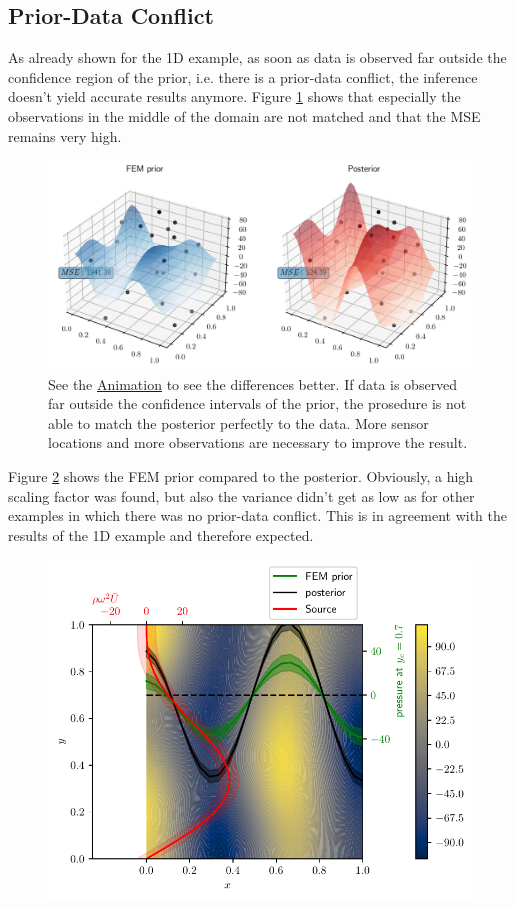 \documentclass[%
  a4paper,oneside,%
  11pt,%
  smallchapters,
  style=printdev,
  extramargin,
  green,%
  rgb, <cmyk>
  ]{tubsbook}
\begin{document}
\subsection{Prior-Data Conflict}
As already shown for the 1D example, as soon as data is observed far outside the confidence region of the prior, i.e. there is a prior-data conflict, the inference doesn't yield accurate results anymore. Figure \ref{fig:3dPriorDataConf} shows that especially the observations in the middle of the domain are not matched and that the MSE remains very high.
%
\begin{figure}[!ht]
\includegraphics[width=1\textwidth]{../../Python/Results/2D/prior_data_conflict/3dMSE.pdf}
\centering
\caption{See the \href{https://github.com/herluc/Masterarbeit/blob/master/MA_LucasHermann/Python/Results/2D/prior_data_conflict/3DMSE_conflict.gif}{Animation} to see the differences better. If data is observed far outside the confidence intervals of the prior, the prosedure is not able to match the posterior perfectly to the data. More sensor locations and more observations are necessary to improve the result.}
\label{fig:3dPriorDataConf}
\end{figure}
%
Figure \ref{fig:PriorDataConfPOST} shows the FEM prior compared to the posterior. Obviously, a high scaling factor was found, but also the variance didn't get as low as for other examples in which there was no prior-data conflict. This is in agreement with the results of the 1D example and therefore expected.
%
\begin{figure}[!ht]
\includegraphics[width=.8\textwidth]{../../Python/Results/2D/prior_data_conflict/SolutionCustomPosterior.pdf}
\centering
\caption{}
\label{fig:PriorDataConfPOST}
\end{figure}
\end{document}
